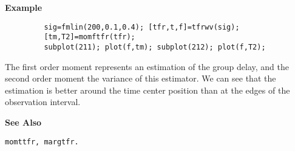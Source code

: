 {\bf \large \sf Example}\\
\hspace*{1.5cm}
\begin{minipage}[t]{13.5cm}
\begin{verbatim}
         sig=fmlin(200,0.1,0.4); [tfr,t,f]=tfrwv(sig); 
         [tm,T2]=momftfr(tfr); 
         subplot(211); plot(f,tm); subplot(212); plot(f,T2); 
\end{verbatim}
The first order moment represents an estimation of the group delay, and the
second order moment the variance of this estimator. We can see that the
estimation is better around the time center position than at the edges of
the observation interval.
\end{minipage}
\vspace*{.35cm}

{\bf \large \sf See Also}\\
\hspace*{1.5cm}
\begin{minipage}[t]{13.5cm}
\begin{verbatim}
momttfr, margtfr.
\end{verbatim}
\end{minipage}

